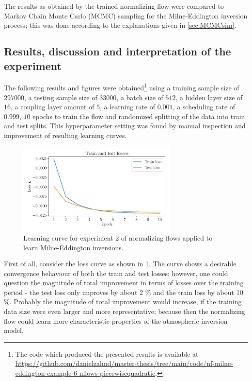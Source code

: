 \documentclass[a4paper,12pt]{report}
\begin{document}
The results as obtained by the trained normalizing flow were compared to Markov Chain Monte Carlo (MCMC) sampling for the Milne-Eddington inversion process; this was done according to the explanations given in \cref{sec:MCMCsim}.

\subsection{Results, discussion and interpretation of the experiment}
The following results and figures were obtained\footnote{The code which produced the presented results is available at \url{https://github.com/danielzahnd/master-thesis/tree/main/code/nf-milne-eddington-example-6-nflows-piecewisequadratic}.} using a training sample size of $297000$, a testing sample size of $33000$, a batch size of $512$, a hidden layer size of $16$, a coupling layer amount of $5$, a learning rate of $0.001$, a scheduling rate of $0.999$, $10$ epochs to train the flow and randomized splitting of the data into train and test splits. This hyperparameter setting was found by manual inspection and improvement of resulting learning curves.

\begin{figure}[h]
\centering
\includegraphics[width=8cm]{figures/nf-milne-eddington-example-6-loss-nflows-piecewisequadratic.pdf}
\caption{Learning curve for experiment 2 of normalizing flows applied to learn Milne-Eddington inversions.}
\label{fig:nf-milne-eddington-example-6-loss-nflows-piecewisequadratic}
\end{figure}

First of all, consider the loss curve as shown in \cref{fig:nf-milne-eddington-example-6-loss-nflows-piecewisequadratic}. The curve shows a desirable convergence behaviour of both the train and test losses; however, one could question the magnitude of total improvement in terms of losses over the training period - the test loss only improves by about 2 \% and the train loss by about 10 \%. Probably the magnitude of total improvement would increase, if the training data size were even larger and more representative; because then the normalizing flow could learn more characteristic properties of the atmospheric inversion model.
\end{document}
